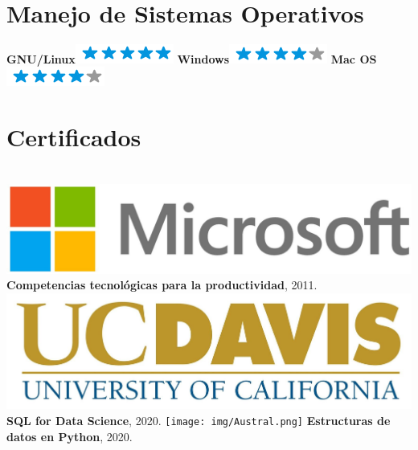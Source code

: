 \documentclass[]{friggeri-cv}
\begin{document}
\begin{aside}
~
~
~
	\section{Manejo de Sistemas Operativos}
    \textbf{GNU/Linux}\includegraphics[scale=0.40]{img/5stars.png}
    \textbf{Windows}\includegraphics[scale=0.40]{img/4stars.png}
    \textbf{Mac OS}\includegraphics[scale=0.40]{img/4stars.png}
	\section{Certificados}
	~
     	\includegraphics[scale=0.04]{img/Microsoft.jpg}
	\textbf{Competencias tecnológicas para la productividad}, 2011.
	\includegraphics[scale=0.2]{img/ucdavis.jpg}
	\textbf{SQL for Data Science}, 2020.
	\texttt{[image: img/Austral.png]}
	\textbf{Estructuras de datos en Python}, 2020.

\end{aside}
\end{document}
